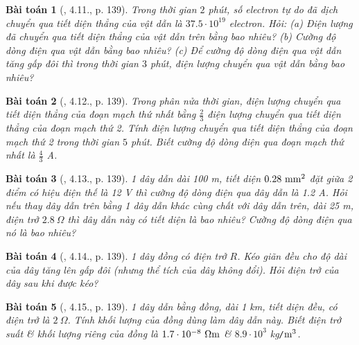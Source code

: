 \documentclass{article}
\newtheorem{baitoan}{Bài toán}
\begin{document}
\begin{baitoan}[\cite{Van_500_BT_Vat_Ly_THCS}, 4.11., p. 139]
	Trong thời gian $2$ phút, số electron tự do đã dịch chuyển qua tiết diện thẳng của vật dẫn là $37.5\cdot10^{19}$ electron. Hỏi: (a) Điện lượng đã chuyển qua tiết diện thẳng của vật dẫn trên bằng bao nhiêu? (b) Cường độ dòng điện qua vật dẫn bằng bao nhiêu? (c) Để cường độ dòng điện qua vật dẫn tăng gấp đôi thì trong thời gian $3$ phút, điện lượng chuyển qua vật dẫn bằng bao nhiêu?
\end{baitoan}

\begin{baitoan}[\cite{Van_500_BT_Vat_Ly_THCS}, 4.12., p. 139]
	Trong phân nửa thời gian, điện lượng chuyển qua tiết diện thẳng của đoạn mạch thứ nhất bằng $\frac{2}{3}$ điện lượng chuyển qua tiết diện thẳng của đoạn mạch thứ 2. Tính điện lượng chuyển qua tiết diện thẳng của đoạn mạch thứ 2 trong thời gian $5$ phút. Biết cường độ dòng điện qua đoạn mạch thứ nhất là $\frac{4}{3}$ \emph{A}.
\end{baitoan}

\begin{baitoan}[\cite{Van_500_BT_Vat_Ly_THCS}, 4.13., p. 139]
	1 dây dẫn dài \emph{100 m}, tiết diện $\rm0.28\ mm^2$ đặt giữa 2 điểm có hiệu điện thế là \emph{12 V} thì cường độ dòng điện qua dây dẫn là \emph{1.2 A}. Hỏi nếu thay dây dẫn trên bằng 1 dây dẫn khác cùng chất với dây dẫn trên, dài \emph{25 m}, điện trở $2.8\ \Omega$ thì dây dẫn này có tiết diện là bao nhiêu? Cường độ dòng điện qua nó là bao nhiêu?
\end{baitoan}

\begin{baitoan}[\cite{Van_500_BT_Vat_Ly_THCS}, 4.14., p. 139]
	1 dây đồng có điện trở $R$. Kéo giãn đều cho độ dài của dây tăng lên gấp đôi (nhưng thể tích của dây không đổi). Hỏi điện trở của dây sau khi được kéo?
\end{baitoan}

\begin{baitoan}[\cite{Van_500_BT_Vat_Ly_THCS}, 4.15., p. 139]
	1 dây dẫn bằng đồng, dài \emph{1 km}, tiết diện đều, có điện trở là $2\ \Omega$. Tính khối lượng của đồng dùng làm dây dẫn này. Biết điện trở suất \& khối lượng riêng của đồng là $\rm1.7\cdot10^{-8}\ \Omega m$ \& $8.9\cdot10^3$ \emph{kg\texttt{/}$\rm m^3$}.
\end{baitoan}


\printbibliography[heading=bibintoc]
	
\end{document}
